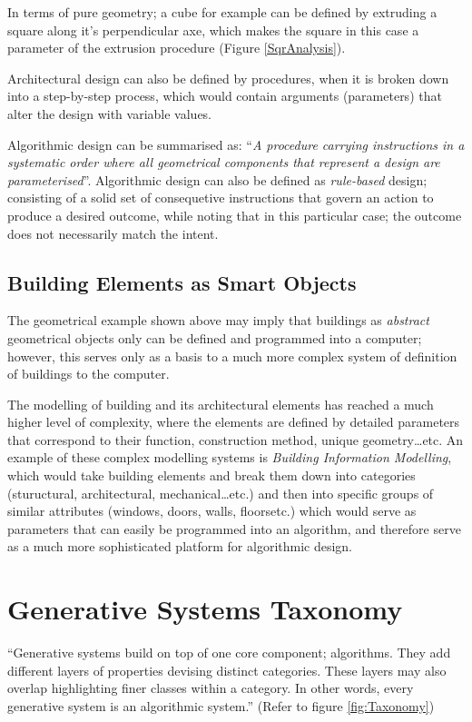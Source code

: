 In terms of pure geometry; a cube for example can be defined by extruding a square along it's perpendicular axe, which makes the square in this case a parameter of the extrusion procedure (Figure \ref{SqrAnalysis}).

Architectural design can also be defined by procedures, when it is broken down into a step-by-step process, which would contain arguments (parameters) that alter the design with variable values. \label{SequentialAlgorithms}

Algorithmic design can be summarised as: ``\emph{A procedure carrying instructions in a systematic order where all geometrical components that represent a design are parameterised}''\cite{hernandez06}. Algorithmic design can also be defined as \emph{rule-based} design; consisting of a solid set of consequetive instructions that govern an action to produce a desired outcome, while noting that in this particular case; the outcome does not necessarily match the intent.

\subsection{Building Elements as Smart Objects}

The geometrical example shown above may imply that buildings as \emph{abstract} geometrical objects only can be defined and programmed into a computer; however, this serves only as a basis to a much more complex system of definition of buildings to the computer. 

The modelling of building and its architectural elements has reached a much higher level of complexity, where the elements are defined by detailed parameters that correspond to their function, construction method, unique geometry\ldots{}etc. An example of these complex modelling systems is \emph{Building Information Modelling}, which would take building elements and break them down into categories (stuructural, architectural, mechanical\ldots{}etc.) and then into specific groups of similar attributes (windows, doors, walls, floors\ldot{}etc.) which would serve as parameters that can easily be programmed into an algorithm, and therefore serve as a much more sophisticated platform for algorithmic design.

\clearpage
\section{Generative Systems Taxonomy}

\label{GenSysTax}
``Generative systems build on top of one core component; algorithms. They add different layers of properties devising distinct categories. These layers may also overlap highlighting finer classes within a category. In other words, every generative system is an algorithmic system.'' \cite{khaldi04} (Refer to figure \ref{fig:Taxonomy})

